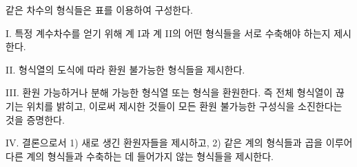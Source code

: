 
같은 차수의 형식들은 표를 이용하여 구성한다.

I. 특정 계수차수를 얻기 위해 계 I과 계 II의 어떤 형식들을 서로 수축해야 하는지 제시한다.

II. 형식열의 도식에 따라 환원 불가능한 형식들을 제시한다.

III. 환원 가능하거나 분해 가능한 형식열 또는 형식을 환원한다. 즉 전체 형식열이 끊기는 위치를 밝히고, 이로써 제시한 것들이 모든 환원 불가능한 구성식을 소진한다는 것을 증명한다.

IV. 결론으로서 1) 새로 생긴 환원자들을 제시하고, 2) 같은 계의 형식들과 곱을 이루어 다른 계의 형식들과 수축하는 데 들어가지 않는 형식들을 제시한다.
